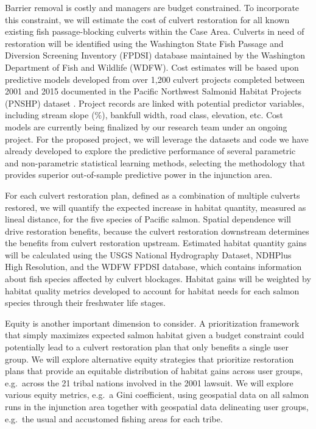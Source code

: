 \documentclass[12pt]{elsarticle}
\begin{document}
	Barrier removal is costly and managers are budget constrained. To incorporate this constraint, we will estimate the cost of culvert restoration for all known existing fish passage-blocking culverts within the Case Area. Culverts in need of restoration will be identified using the Washington State Fish Passage and Diversion Screening Inventory (FPDSI) database maintained by the Washington Department of Fish and Wildlife (WDFW). Cost estimates will be based upon predictive models developed from over 1,200 culvert projects completed between 2001 and 2015 documented in the Pacific Northwest Salmonid Habitat Projects (PNSHP) dataset \citep{katz_freshwater_2007,noauthor_pacific_2021}. Project records are linked with potential predictor variables, including stream slope (\%), bankfull width, road class, elevation, etc. Cost models are currently being finalized by our research team under an ongoing project. For the proposed project, we will leverage the datasets and code we have already developed to explore the predictive performance of several parametric and non-parametric statistical learning methods, selecting the methodology that provides superior out-of-sample predictive power in the injunction area.
	
	For each culvert restoration plan, defined as a combination of multiple culverts restored, we will quantify the expected increase in habitat quantity, measured as lineal distance, for the five species of Pacific salmon. Spatial dependence will drive restoration benefits, because the culvert restoration downstream determines the benefits from culvert restoration upstream. Estimated habitat quantity gains will be calculated using the USGS National Hydrography Dataset, NDHPlus High Resolution, and the WDFW FPDSI database, which contains information about fish species affected by culvert blockages. Habitat gains will be weighted by habitat quality metrics developed to account for habitat needs for each salmon species through their freshwater life stages. 
	
	Equity is another important dimension to consider. A prioritization framework that simply maximizes expected salmon habitat given a budget constraint could potentially lead to a culvert restoration plan that only benefits a single user group. We will explore alternative equity strategies that prioritize restoration plans that provide an equitable distribution of habitat gains across user groups, e.g.\ across the 21 tribal nations involved in the 2001 lawsuit. We will explore various equity metrics, e.g.\ a Gini coefficient, using geospatial data on all salmon runs in the injunction area together with geospatial data delineating user groups, e.g.\ the usual and accustomed fishing areas for each tribe. 
	
\end{document}
